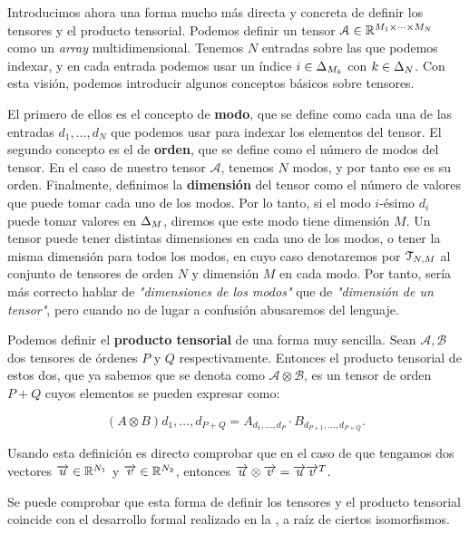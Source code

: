 Introducimos ahora una forma mucho más directa y concreta de definir los tensores y el producto tensorial. Podemos definir un tensor $\mathcal{A} \in \mathbb{R}^{M_1 \times \cdots \times M_N}$ como un \textit{array} multidimensional. Tenemos $N$ entradas sobre las que podemos indexar, y en cada entrada podemos usar un índice $i \in \Delta_{M_k}$ con $k \in \Delta_{N}$. Con esta visión, podemos introducir algunos conceptos básicos sobre tensores.

El primero de ellos es el concepto de \textbf{modo}, que se define como cada una de las entradas $d_1, \ldots, d_N$ que podemos usar para indexar los elementos del tensor. El segundo concepto es el de \textbf{orden}, que se define como el número de modos del tensor. En el caso de nuestro tensor $\mathcal{A}$, tenemos $N$ modos, y por tanto ese es su orden. Finalmente, definimos la \textbf{dimensión} del tensor como el número de valores que puede tomar cada uno de los modos. Por lo tanto, si el modo $i$-ésimo $d_i$ puede tomar valores en $\Delta_{M}$, diremos que este modo tiene dimensión $M$. Un tensor puede tener distintas dimensiones en cada uno de los modos, o tener la misma dimensión para todos los modos, en cuyo caso denotaremos por $\mathcal{T}_{N, M}$ al conjunto de tensores de orden $N$ y dimensión $M$ en cada modo. Por tanto, sería más correcto hablar de \textit{"dimensiones de los modos"} que de \textit{"dimensión de un tensor"}, pero cuando no de lugar a confusión abusaremos del lenguaje.

Podemos definir el \textbf{producto tensorial} de una forma muy sencilla. Sean $\mathcal{A}, \mathcal{B}$ dos tensores de órdenes $P$ y $Q$ respectivamente. Entonces el producto tensorial de estos dos, que ya sabemos que se denota como $\mathcal{A} \otimes \mathcal{B}$, es un tensor de orden $P + Q$ cuyos elementos se pueden expresar como:

$$(A \otimes B)d_1, \ldots, d_{P + Q} = A_{d_1, \ldots, d_P} \cdot B_{d_{P + 1}, \ldots, d_{P + Q}}.$$

\begin{observacion}
	Usando esta definición es directo comprobar que en el caso de que tengamos dos vectores $\overrightarrow{u} \in \mathbb{R}^{N_1}$ y $\overrightarrow{v} \in \mathbb{R}^{N_2}$, entonces $\overrightarrow{u} \otimes \overrightarrow{v} = \overrightarrow{u} \overrightarrow{v}^T$.
\end{observacion}

\begin{observacion}
	Se puede comprobar que esta forma de definir los tensores y el producto tensorial coincide con el desarrollo formal realizado en la , a raíz de ciertos isomorfismos.
\end{observacion}

